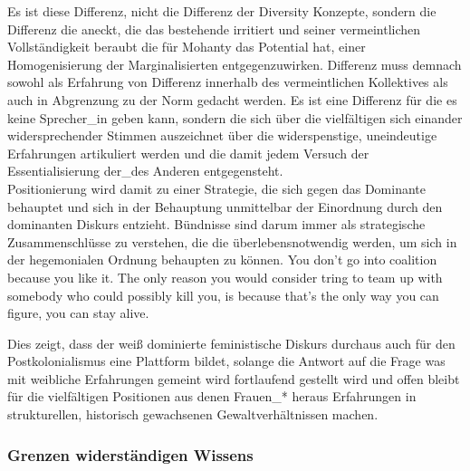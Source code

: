 Es ist diese Differenz, nicht die Differenz der Diversity Konzepte, sondern die
Differenz die aneckt, die das bestehende irritiert und seiner vermeintlichen
Vollständigkeit beraubt die für Mohanty das Potential hat, einer
Homogenisierung der Marginalisierten entgegenzuwirken. Differenz muss demnach
sowohl als Erfahrung von Differenz innerhalb des vermeintlichen Kollektives als
auch in Abgrenzung zu der Norm gedacht werden. Es ist eine Differenz für die es
keine Sprecher\_in geben kann, sondern die sich über die vielfältigen sich
einander widersprechender Stimmen \footnotemark {} auszeichnet über die widerspenstige,
uneindeutige Erfahrungen artikuliert werden und die damit jedem Versuch der
Essentialisierung der\_des Anderen entgegensteht. \\
Positionierung wird damit zu
einer Strategie, die sich gegen das Dominante behauptet und sich in der
Behauptung unmittelbar der Einordnung durch den dominanten Diskurs entzieht.
Bündnisse sind darum immer als strategische Zusammenschlüsse zu verstehen, die
die überlebensnotwendig werden, um sich in der hegemonialen Ordnung behaupten
zu können. \glqq You don't go into coalition because you like it. The only reason
you would consider tring to team up with somebody who could possibly kill you,
is because that's the only way you can figure, you can stay alive. \grqq
\footnotemark {}

Dies zeigt, dass der weiß dominierte feministische Diskurs durchaus auch für
den Postkolonialismus eine Plattform bildet, solange die Antwort auf die Frage
was mit weibliche Erfahrungen gemeint wird fortlaufend gestellt wird und offen
bleibt für die vielfältigen Positionen aus denen Frauen\_* heraus Erfahrungen
in strukturellen, historisch gewachsenen Gewaltverhältnissen machen.

\subsubsection{Grenzen widerständigen Wissens}

